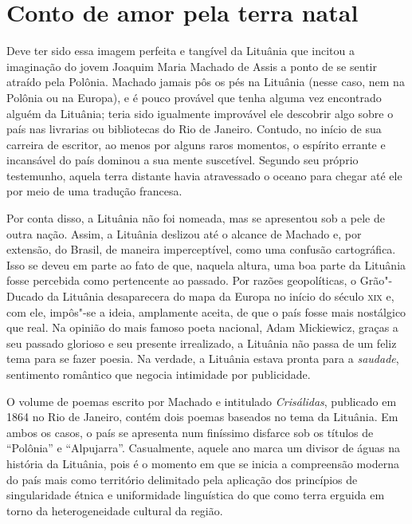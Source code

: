 \section*{Conto de amor pela terra natal}

Deve ter sido essa imagem perfeita e tangível da Lituânia que incitou a
imaginação do jovem Joaquim Maria Machado de Assis a ponto de se sentir
atraído pela Polônia. Machado jamais pôs os pés na Lituânia (nesse caso,
nem na Polônia ou na Europa), e é pouco provável que tenha alguma vez
encontrado alguém da Lituânia; teria sido igualmente improvável ele
descobrir algo sobre o país nas livrarias ou bibliotecas do Rio de
Janeiro. Contudo, no início de sua carreira de escritor, ao menos por
alguns raros momentos, o espírito errante e incansável do país dominou a
sua mente suscetível. Segundo seu próprio testemunho, aquela terra
distante havia atravessado o oceano para chegar até ele por meio de uma
tradução francesa. 

Por conta disso, a Lituânia não foi nomeada, mas se
apresentou sob a pele de outra nação. Assim, a Lituânia deslizou até o
alcance de Machado e, por extensão, do Brasil, de maneira imperceptível,
como uma confusão cartográfica. Isso se deveu em parte ao fato de que,
naquela altura, uma boa parte da Lituânia fosse percebida como
pertencente ao passado. Por razões geopolíticas, o Grão"-Ducado da
Lituânia desaparecera do mapa da Europa no início do século \textsc{xix} e,
com ele, impôs"-se a ideia, amplamente aceita, de que o país fosse mais
nostálgico que real. Na opinião do mais famoso poeta nacional, Adam
Mickiewicz, graças a seu passado glorioso e seu presente irrealizado, a
Lituânia não passa de um feliz tema para se fazer poesia. Na verdade, a
Lituânia estava pronta para a \textit{saudade}, sentimento romântico que negocia
intimidade por publicidade.

O volume de poemas escrito por Machado e intitulado \textit{Crisálidas},
publicado em 1864 no Rio de Janeiro, contém dois poemas baseados no tema
da Lituânia. Em ambos os casos, o país se apresenta num finíssimo
disfarce sob os títulos de ``Polônia'' e ``Alpujarra''.
Casualmente, aquele ano marca um divisor de águas na história da
Lituânia, pois é o momento em que se inicia a compreensão moderna do
país mais como território delimitado pela aplicação dos princípios de
singularidade étnica e uniformidade linguística do que como terra
erguida em torno da heterogeneidade cultural da região. 

